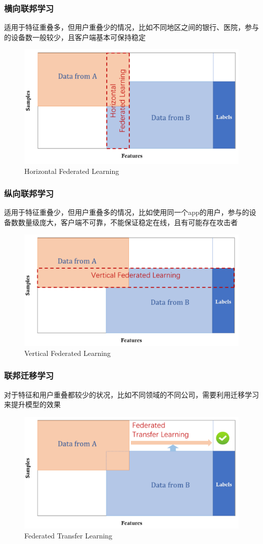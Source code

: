 \documentclass[hyperref={pdfpagelabels=false}]{beamer}
\begin{document}
\begin{frame}
	\frametitle{横向联邦学习}
	\begin{block}{}
		适用于特征重叠多，但用户重叠少的情况，比如不同地区之间的银行、医院，参与的设备数一般较少，且客户端基本可保持稳定
	\end{block}
	\begin{figure}
		\centering
		\includegraphics[width=.6\textwidth]{./figure/hor-fl.png}
		\caption{Horizontal Federated Learning\cite{Yang2019}}
	\end{figure}
\end{frame}

\begin{frame}
	\frametitle{纵向联邦学习}
	\begin{block}{}
		适用于特征重叠少，但用户重叠多的情况，比如使用同一个app的用户，参与的设备数数量级庞大，客户端不可靠，不能保证稳定在线，且有可能存在攻击者
	\end{block}
	\begin{figure}
		\centering
		\includegraphics[width=.6\textwidth]{./figure/ver-fl.png}
		\caption{Vertical Federated Learning\cite{Yang2019}}
	\end{figure}
\end{frame}

\begin{frame}
	\frametitle{联邦迁移学习}
	\begin{block}{}
		对于特征和用户重叠都较少的状况，比如不同领域的不同公司，需要利用迁移学习来提升模型的效果
	\end{block}
	\begin{figure}
		\centering
		\includegraphics[width=.6\textwidth]{./figure/fl-tran.png}
		\caption{Federated Transfer Learning\cite{Yang2019}}
	\end{figure}
\end{frame}
\end{document}
